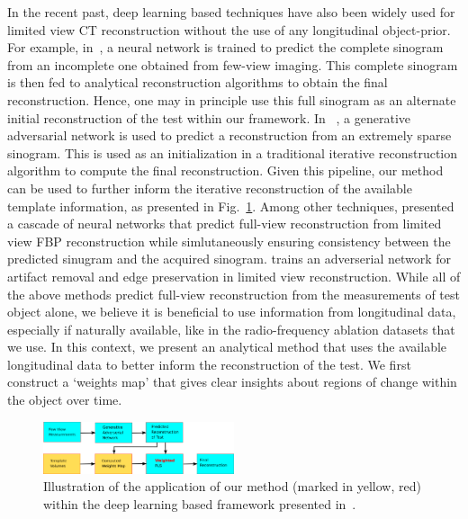 \documentclass[journal]{IEEEtran}
\begin{document}
In the recent past, deep learning based techniques have also been widely used for limited view CT reconstruction without the use of any longitudinal object-prior. For example, in~\cite{anirudh}, a neural network is trained to predict the complete sinogram from an incomplete one obtained from few-view imaging. This complete sinogram is then fed to analytical reconstruction algorithms to obtain the final reconstruction. Hence, one may in principle use this full sinogram as an alternate initial reconstruction of the test within our framework. In ~\cite{kim2019extreme}, a generative adversarial network is used to predict a reconstruction from an extremely sparse sinogram. This is used as an initialization in  a traditional iterative reconstruction algorithm to compute the final reconstruction. Given this pipeline, our method can be used to further inform the iterative reconstruction of the available template information, as presented in Fig.~\ref{fig:Lit}. Among other techniques, \cite{bo2021} presented a cascade of neural networks that predict full-view reconstruction from limited view FBP reconstruction while simlutaneously ensuring consistency between the predicted sinugram and the acquired sinogram. \cite{special} trains an adverserial network for artifact removal and edge preservation in limited view reconstruction. While all of the above methods predict full-view reconstruction from the measurements of test object alone, we believe it is beneficial to use information from longitudinal data, especially if naturally available, like in the radio-frequency ablation datasets that we use. In this context, we present an analytical method that uses the available longitudinal data to better inform the reconstruction of the test. We first construct a `weights map' that gives clear insights about regions of change within the object over time.

\begin{figure}[t]
\centering
	\includegraphics[width=0.5\textwidth]{../images/Lit.png}
        \caption{Illustration of the application of our method (marked in yellow, red) within the deep learning based framework presented in~\cite{kim2019extreme}.}
 \label{fig:Lit}
 \end{figure} 
 
\end{document}

